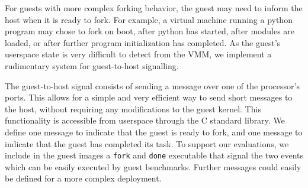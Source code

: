 For guests with more complex forking behavior, the guest may need to inform the
host when it is ready to fork. For example, a virtual machine running a python
program may chose to fork on boot, after python has started, after modules are
loaded, or after further program initialization has completed. As the guest's
userspace state is very difficult to detect from the VMM, we implement a
rudimentary system for guest-to-host signalling.

The guest-to-host signal consists of sending a message over one of the
processor's ports. This allows for a simple and very efficient way to send
short messages to the host, without requiring any modifications to the guest
kernel. This functionality is accessible from userspace through the C standard
library. We define one message to indicate that the guest is ready to fork, and
one message to indicate that the guest has completed its task. To support our
evaluations, we include in the guest images a \texttt{fork} and \texttt{done}
executable that signal the two events which can be easily executed by guest
benchmarks. Further messages could easily be defined for a more complex
deployment.

